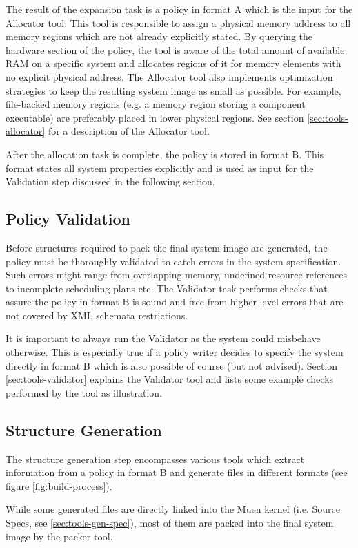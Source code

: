 \documentclass[a4paper,twoside,titlepage]{article}
\begin{document}
The result of the expansion task is a policy in format A which is the input for
the Allocator tool. This tool is responsible to assign a physical memory
address to all memory regions which are not already explicitly stated. By
querying the hardware section of the policy, the tool is aware of the total
amount of available RAM on a specific system and allocates regions of it for
memory elements with no explicit physical address.  The Allocator tool also
implements optimization strategies to keep the resulting system image as small
as possible.  For example, file-backed memory regions (e.g. a memory region
storing a component executable) are preferably placed in lower physical
regions. See section \ref{sec:tools-allocator} for a description of the
Allocator tool.

After the allocation task is complete, the policy is stored in format B. This
format states all system properties explicitly and is used as input for the
Validation step discussed in the following section.

\subsection{Policy Validation}
\label{subsec:policy_validation}
Before structures required to pack the final system image are generated, the
policy must be thoroughly validated to catch errors in the system
specification.  Such errors might range from overlapping memory, undefined
resource references to incomplete scheduling plans etc. The Validator task
performs checks that assure the policy in format B is sound and free from
higher-level errors that are not covered by XML schemata restrictions.

It is important to always run the Validator as the system could misbehave
otherwise. This is especially true if a policy writer decides to specify the
system directly in format B which is also possible of course (but not advised).
Section \ref{sec:tools-validator} explains the Validator tool and lists some
example checks performed by the tool as illustration.

\subsection{Structure Generation}
The structure generation step encompasses various tools which extract
information from a policy in format B and generate files in different formats
(see figure \ref{fig:build-process}).

While some generated files are directly linked into the Muen kernel (i.e.
Source Specs, see \ref{sec:tools-gen-spec}), most of them are packed into the
final system image by the packer tool.
\end{document}

